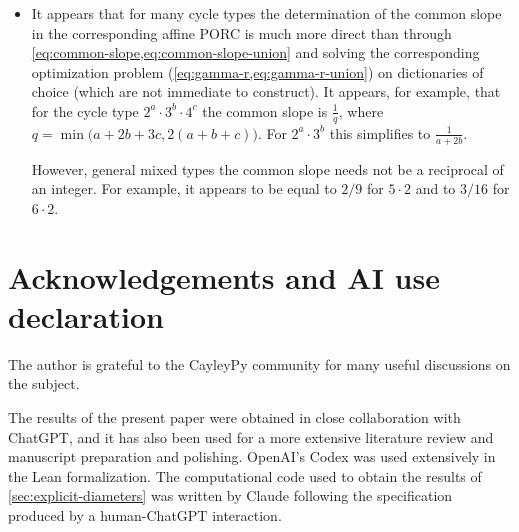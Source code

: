 \documentclass[DIV=12,10pt]{scrartcl}
\theoremstyle{definition}
\begin{document}
\begin{itemize}
\begin{itemize}
\end{itemize}
\item It appears that for many cycle types the determination of the common slope in the corresponding affine PORC is much more direct than through \cref{eq:common-slope,eq:common-slope-union} and solving the corresponding optimization problem (\cref{eq:gamma-r,eq:gamma-r-union}) on dictionaries of choice (which are not immediate to construct). It appears, for example, that for the cycle type $2^a{\cdot}3^b{\cdot}4^c$ the common slope is $\frac{1}{q}$, where $q=\min\big(a+2b+3c,2(a+b+c)\big)$. For $2^a{\cdot}3^b$ this simplifies to $\frac{1}{a+2b}$.

However, general mixed types the common slope needs not be a reciprocal of an integer. For example, it appears to be equal to $2/9$ for $5{\cdot}2$ and to $3/16$ for $6{\cdot}2$.
\end{itemize}

\section*{Acknowledgements and AI use declaration}
The author is grateful to the CayleyPy community for many useful discussions on the subject.

The results of the present paper were obtained in close collaboration with ChatGPT, and it has also been used for a more extensive literature review and manuscript preparation and polishing. OpenAI's Codex was used extensively in the Lean formalization. The computational code used to obtain the results of \cref{sec:explicit-diameters} was written by Claude following the specification produced by a human-ChatGPT interaction.



\clearpage
\end{document}
